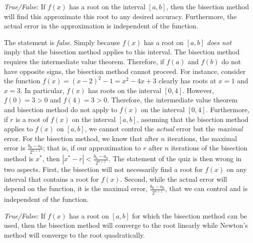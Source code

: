 \documentclass[11pt,letterpaper]{article}
\begin{document}
\quizsol \textit{True/False}: If $f(x)$ has a root on the interval $[a, b]$, then the bisection method will find this approximate this root to any desired accuracy. Furthermore, the actual error in the approximation is independent of the function. \pspace

\sol The statement is \textit{false}. Simply because $f(x)$ has a root on $[a, b]$ \textit{does not} imply that the bisection method applies to this interval. The bisection method requires the intermediate value theorem. Therefore, if $f(a)$ and $f(b)$ do not have opposite signs, the bisection method cannot proceed. For instance, consider the function $f(x)= (x - 2)^2 - 1= x^2 - 4x + 3$ clearly has roots at $x= 1$ and $x= 3$. In particular, $f(x)$ has roots on the interval $[0, 4]$. However, $f(0)= 3 > 0$ and $f(4)= 3 > 0$. Therefore, the intermediate value theorem and bisection method do not apply to $f(x)$ on the interval $[0, 4]$. Furthermore, if $r$ is a root of $f(x)$ on the interval $[a, b]$, assuming that the bisection method applies to $f(x)$ on $[a, b]$, we cannot control the \textit{actual} error but the \textit{maximal} error. For the bisection method, we know that after $n$ iterations, the maximal error is $\frac{b_0 - a_0}{2^{n + 1}}$; that is, if our approximation to $r$ after $n$ iterations of the bisection method is $x^*$, then $|x^* - r| < \frac{b_0 - a_0}{2^{n + 1}}$. The statement of the quiz is then wrong in two aspects. First, the bisection will not necessarily find a root for $f(x)$ on any interval that contains a root for $f(x)$. Second, while the actual error will depend on the function, it is the maximal error, $\frac{b_0 - a_0}{2^{n + 1}}$, that we can control and is independent of the function. \pvspace{1.3cm}



\quizsol \textit{True/False}: If $f(x)$ has a root on $[a, b]$ for which the bisection method can be used, then the bisection method will converge to the root linearly while Newton's method will converge to the root quadratically. \pspace
\end{document}
